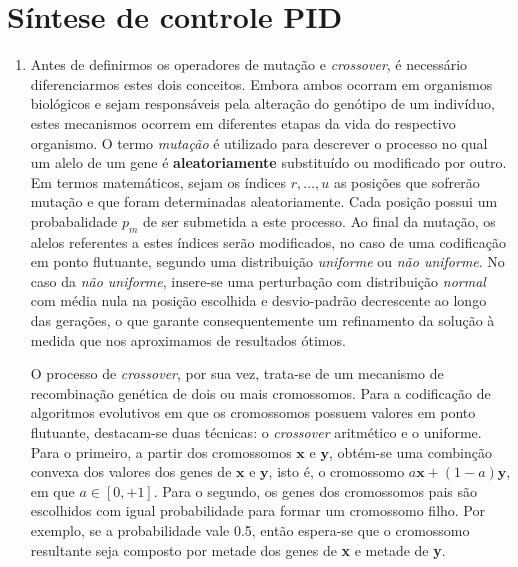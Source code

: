 \section{Síntese de controle PID}
\label{sec:pid}
 
\begin {enumerate}
  \item Antes de definirmos os operadores de mutação e \textit{crossover}, é
  necessário diferenciarmos estes dois conceitos. Embora ambos ocorram em
  organismos biológicos e sejam responsáveis pela alteração do genótipo de um
  indivíduo, estes mecanismos ocorrem em diferentes etapas da vida do respectivo
  organismo. O termo \textit{mutação} é utilizado para descrever o processo no
  qual um alelo de um gene é \textbf{aleatoriamente} substituído ou modificado
  por outro. Em termos matemáticos, sejam os índices \(r, \ldots, u\) as
  posições que sofrerão mutação e que foram determinadas aleatoriamente. Cada
  posição possui um probabalidade \(p_m\) de ser submetida a este processo. Ao
  final da mutação, os alelos referentes a estes índices serão modificados, no
  caso de uma codificação em ponto flutuante, segundo uma distribuição
  \textit{uniforme} ou \textit{não uniforme}. No caso da \textit{não uniforme},
  insere-se uma perturbação com distribuição \textit{normal} com média nula na
  posição escolhida e desvio-padrão decrescente ao longo das gerações, o que
  garante consequentemente um refinamento da solução à medida que nos
  aproximamos de resultados ótimos. 
  
  O processo de \textit{crossover}, por sua vez, trata-se de um mecanismo de
  recombinação genética de dois ou mais cromossomos. Para a codificação de
  algoritmos evolutivos em que os cromossomos possuem valores em ponto
  flutuante, destacam-se duas técnicas: o \textit{crossover} aritmético e o
  uniforme. Para o primeiro, a partir dos cromossomos \(\textbf{x}\) e \(\textbf{y}\),
  obtém-se uma combinção convexa dos valores dos genes de \(\textbf{x}\) e
  \(\textbf{y}\), isto é, o cromossomo \(a\textbf{x} + (1-a)\textbf{y}\), em que
  \(a \in [0, +1]\). Para o segundo, os genes dos cromossomos pais são
  escolhidos com igual probabilidade para formar um cromossomo filho. Por
  exemplo, se a probabilidade vale 0.5, então espera-se que o cromossomo
  resultante seja composto por metade dos genes de \textbf{x} e metade de
  \textbf{y}.
  

\end{enumerate}
